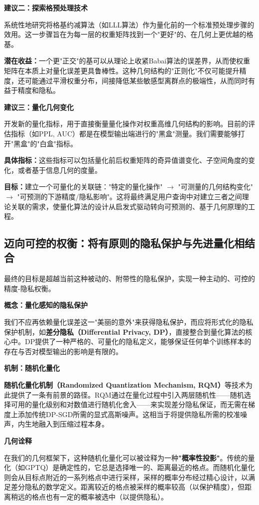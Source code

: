 \documentclass[letterpaper,twocolumn,10pt]{article}
\begin{document}
\textbf{建议二：探索格预处理技术}

系统性地研究将格基约减算法（如LLL算法）作为量化前的一个标准预处理步骤的效用。这一步骤旨在为每一层的权重矩阵找到一个"更好"的、在几何上更优越的格基。

\textbf{潜在收益：}一个更"正交"的基可以从理论上收紧Babai算法的误差界，从而使权重矩阵在本质上对量化误差更具鲁棒性。这种几何结构的"正则化"不仅可能提升精度，还可能通过平滑权重分布，间接降低某些敏感型离群点的极端性，从而同时有益于精度和隐私。

\textbf{建议三：量化几何变化}

开发新的量化指标，用于直接衡量量化操作对权重高维几何结构的影响。目前的评估指标（如PPL, AUC）都是在模型输出端进行的"黑盒"测量。我们需要能够打开"黑盒"的"白盒"指标。

\textbf{具体指标：}这些指标可以包括量化前后权重矩阵的奇异值谱变化、子空间角度的变化，或者基于信息几何的度量。

\textbf{目标：}建立一个可量化的关联链："特定的量化操作" $\rightarrow$ "可测量的几何结构变化" $\rightarrow$ "可预测的下游精度/隐私影响"。这将最终满足用户查询中对建立三者之间理论关联的需求，使量化算法的设计从启发式驱动转向可预测的、基于几何原理的工程。

\subsection{迈向可控的权衡：将有原则的隐私保护与先进量化相结合}

最终的目标是超越当前这种被动的、附带性的隐私保护，实现一种主动的、可控的精度-隐私权衡。

\textbf{概念：量化感知的隐私保护}

我们不应再依赖量化误差这一"美丽的意外"来获得隐私保护，而应将形式化的隐私保护机制，如\textbf{差分隐私（Differential Privacy, DP）}，直接整合到量化算法的核心中。DP提供了一种严格的、可量化的隐私定义，能够保证任何单个训练样本的存在与否对模型输出的影响是有限的。

\textbf{机制：随机化量化}

\textbf{随机化量化机制（Randomized Quantization Mechanism, RQM）}等技术为此提供了一条有前景的路径。RQM通过在量化过程中引入两层随机性——随机选择可用的量化级别和对数值进行随机化舍入——来实现差分隐私保证，而无需在梯度上添加传统DP-SGD所需的显式高斯噪声。这相当于将提供隐私所需的校准噪声，内生地融入到压缩过程本身。

\textbf{几何诠释}

在我们的几何框架下，这种随机化量化可以被诠释为一种\textbf{"概率性投影"}。传统的量化（如GPTQ）是确定性的，它总是选择唯一的、距离最近的格点。而随机化量化则会从目标点附近的一系列格点中进行采样，采样的概率分布经过精心设计，以满足差分隐私的数学定义。距离较近的格点被采样的概率较高（以保护精度），但距离稍远的格点也有一定的概率被选中（以提供隐私）。
\end{document}
